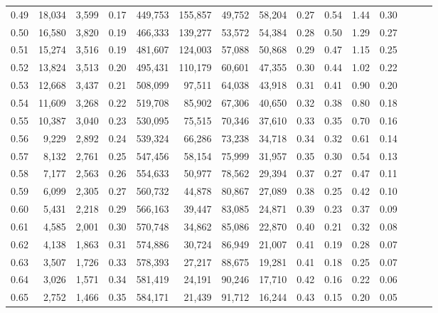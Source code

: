 \begin{tabular}{rrrrrrrrrrrrrrr}
0.49 &  18,034 &  3,599 &  0.17 &  449,753 &  155,857 &   49,752 &   58,204 &  0.27 &  0.54 &  1.44 &      0.30 \\
0.50 &  16,580 &  3,820 &  0.19 &  466,333 &  139,277 &   53,572 &   54,384 &  0.28 &  0.50 &  1.29 &      0.27 \\
0.51 &  15,274 &  3,516 &  0.19 &  481,607 &  124,003 &   57,088 &   50,868 &  0.29 &  0.47 &  1.15 &      0.25 \\
0.52 &  13,824 &  3,513 &  0.20 &  495,431 &  110,179 &   60,601 &   47,355 &  0.30 &  0.44 &  1.02 &      0.22 \\
0.53 &  12,668 &  3,437 &  0.21 &  508,099 &   97,511 &   64,038 &   43,918 &  0.31 &  0.41 &  0.90 &      0.20 \\
0.54 &  11,609 &  3,268 &  0.22 &  519,708 &   85,902 &   67,306 &   40,650 &  0.32 &  0.38 &  0.80 &      0.18 \\
0.55 &  10,387 &  3,040 &  0.23 &  530,095 &   75,515 &   70,346 &   37,610 &  0.33 &  0.35 &  0.70 &      0.16 \\
0.56 &   9,229 &  2,892 &  0.24 &  539,324 &   66,286 &   73,238 &   34,718 &  0.34 &  0.32 &  0.61 &      0.14 \\
0.57 &   8,132 &  2,761 &  0.25 &  547,456 &   58,154 &   75,999 &   31,957 &  0.35 &  0.30 &  0.54 &      0.13 \\
0.58 &   7,177 &  2,563 &  0.26 &  554,633 &   50,977 &   78,562 &   29,394 &  0.37 &  0.27 &  0.47 &      0.11 \\
0.59 &   6,099 &  2,305 &  0.27 &  560,732 &   44,878 &   80,867 &   27,089 &  0.38 &  0.25 &  0.42 &      0.10 \\
0.60 &   5,431 &  2,218 &  0.29 &  566,163 &   39,447 &   83,085 &   24,871 &  0.39 &  0.23 &  0.37 &      0.09 \\
0.61 &   4,585 &  2,001 &  0.30 &  570,748 &   34,862 &   85,086 &   22,870 &  0.40 &  0.21 &  0.32 &      0.08 \\
0.62 &   4,138 &  1,863 &  0.31 &  574,886 &   30,724 &   86,949 &   21,007 &  0.41 &  0.19 &  0.28 &      0.07 \\
0.63 &   3,507 &  1,726 &  0.33 &  578,393 &   27,217 &   88,675 &   19,281 &  0.41 &  0.18 &  0.25 &      0.07 \\
0.64 &   3,026 &  1,571 &  0.34 &  581,419 &   24,191 &   90,246 &   17,710 &  0.42 &  0.16 &  0.22 &      0.06 \\
0.65 &   2,752 &  1,466 &  0.35 &  584,171 &   21,439 &   91,712 &   16,244 &  0.43 &  0.15 &  0.20 &      0.05 \\

\end{tabular}
